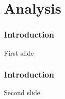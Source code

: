 \section{Analysis}

\begin{frame}
    \frametitle{Introduction}

    First slide

\end{frame}

\begin{frame}
    \frametitle{Introduction}

    Second slide

\end{frame}
